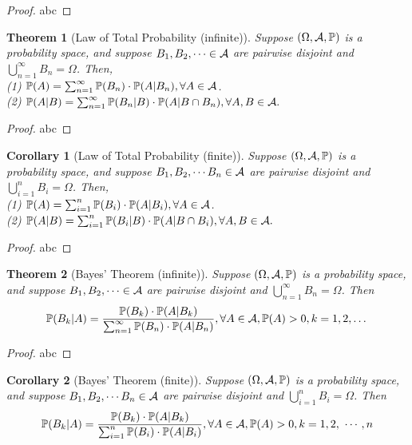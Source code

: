 \documentclass[openany,12pt]{book}
\newtheorem{theorem}{Theorem}[chapter]
\newtheorem{corollary}{Corollary}[chapter]
\begin{document}
\begin{proof}
  abc
\end{proof}

\begin{theorem}[Law of Total Probability (infinite)]
Suppose $(\Omega,\mathcal{A},\mathbb{P})$ is a probability space, and suppose $B_1,B_2,\cdots\in\mathcal{A}$ are pairwise disjoint and $\bigcup_{n=1}^\infty B_n=\Omega$. Then,\\
(1) $\mathbb{P}(A)=\sum_{n=1}^{\infty} \mathbb{P}(B_n )\cdot \mathbb{P}(A|B_n ),\forall A\in\mathcal{A}$.\\
(2) $\mathbb{P}(A|B)=\sum_{n=1}^{\infty} \mathbb{P}(B_n |B)\cdot \mathbb{P}(A|B\cap B_n ),\forall A,B\in\mathcal{A}.$
\end{theorem}

\begin{proof}
  abc
\end{proof}

\begin{corollary}[Law of Total Probability (finite)]
Suppose $(\Omega,\mathcal{A},\mathbb{P})$ is a probability space, and suppose $B_1,B_2,\cdots B_n\in\mathcal{A}$ are pairwise disjoint and $\bigcup_{i=1}^n B_i=\Omega$. Then,\\
(1) $\mathbb{P}(A)=\sum_{i=1}^{n} \mathbb{P}(B_i )\cdot \mathbb{P}(A|B_i ),\forall A\in\mathcal{A}$.\\
(2) $\mathbb{P}(A|B)=\sum_{i=1}^{n} \mathbb{P}(B_i |B)\cdot \mathbb{P}(A|B\cap B_i ),\forall A,B\in\mathcal{A}.$
\end{corollary}

\begin{proof}
  abc
\end{proof}

\begin{theorem}[Bayes' Theorem (infinite)]
Suppose $(\Omega,\mathcal{A},\mathbb{P})$ is a probability space, and suppose $B_1,B_2,\cdots\in\mathcal{A}$ are pairwise disjoint and $\bigcup_{n=1}^\infty B_n=\Omega$.  Then $$\mathbb{P}(B_k|A)=\frac{\mathbb{P}(B_k)\cdot \mathbb{P}(A|B_k)}{\sum_{n=1}^{\infty} \mathbb{P}(B_n )\cdot \mathbb{P}(A|B_n )},\forall A\in\mathcal{A}, \mathbb{P}(A)>0,k=1,2,\dots$$
\end{theorem}

\begin{proof}
  abc
\end{proof}

\begin{corollary}[Bayes' Theorem (finite)]
Suppose $(\Omega,\mathcal{A},\mathbb{P})$ is a probability space, and suppose $B_1,B_2,\cdots B_n\in\mathcal{A}$ are pairwise disjoint and $\bigcup_{i=1}^n B_i=\Omega$.  Then $$\mathbb{P}(B_k|A)=\frac{\mathbb{P}(B_k)\cdot \mathbb{P}(A|B_k)}{\sumin \mathbb{P}(B_i )\cdot \mathbb{P}(A|B_i )},\forall A\in\ma, \mathbb{P}(A)>0,k=1,2,\ \cdots,n$$
\end{corollary}
\end{document}
